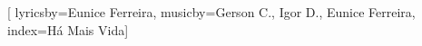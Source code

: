 %

\setcounter{songnum}{146}

[
        lyricsby={Eunice Ferreira}, 
        musicby={Gerson C., Igor D., Eunice Ferreira},
        index={Há Mais Vida}]

